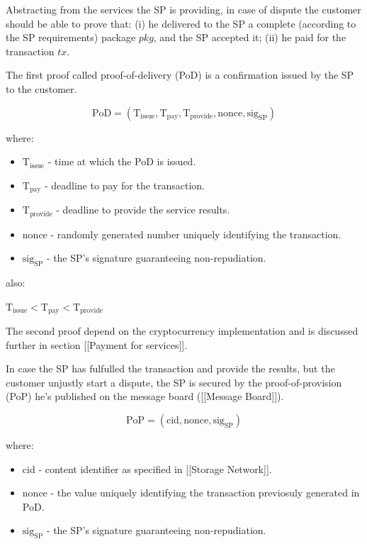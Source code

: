 \documentclass{ieeeaccess}
\begin{document}
Abstracting from the services the SP is providing, in case of dispute
the customer should be able to prove that: (i) he delivered to the SP a
complete (according to the SP requirements) package \(pkg\), and the SP
accepted it; (ii) he paid for the transaction \(tx\).

The first proof called proof-of-delivery (PoD) is a confirmation issued
by the SP to the customer.

\[\mathrm{PoD} = (\mathrm{T}_\mathrm{issue}, \mathrm{T}_\mathrm{pay}, \mathrm{T}_\mathrm{provide}, \mathrm{nonce}, \mathrm{sig}_\mathrm{SP})\]

where:

\begin{itemize}

\item
  \(\mathrm{T}_\mathrm{issue}\) - time at which the PoD is issued.
\item
  \(\mathrm{T}_\mathrm{pay}\) - deadline to pay for the transaction.
\item
  \(\mathrm{T}_\mathrm{provide}\) - deadline to provide the service
  results.
\item
  \(\mathrm{nonce}\) - randomly generated number uniquely identifying
  the transaction.
\item
  \(\mathrm{sig}_\mathrm{SP}\) - the SP's signature guaranteeing
  non-repudiation.
\end{itemize}

also:

\(\mathrm{T}_\mathrm{issue} < \mathrm{T}_\mathrm{pay} < \mathrm{T}_\mathrm{provide}\)

The second proof depend on the cryptocurrency implementation and is
discussed further in section {[}{[}Payment for services{]}{]}.

In case the SP has fulfulled the transaction and provide the results,
but the customer unjustly start a dispute, the SP is secured by the
proof-of-provision (PoP) he's published on the message board
({[}{[}Message Board{]}{]}).

\[\mathrm{PoP} = (\mathrm{cid}, \mathrm{nonce}, \mathrm{sig}_\mathrm{SP})\]

where:

\begin{itemize}

\item
  \(\mathrm{cid}\) - content identifier as specified in {[}{[}Storage
  Network{]}{]}.
\item
  \(\mathrm{nonce}\) - the value uniquely identifying the transaction
  previosuly generated in PoD.
\item
  \(\mathrm{sig}_\mathrm{SP}\) - the SP's signature guaranteeing
  non-repudiation.
\end{itemize}
\end{document}
